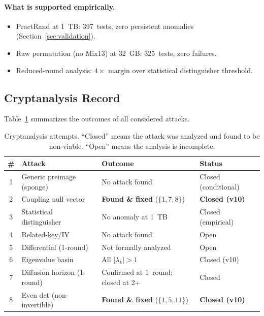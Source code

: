 \documentclass[runningheads]{llncs}
\begin{document}
\paragraph{What is supported empirically.}
\begin{itemize}[nosep]
\item PractRand at 1~TB: 397~tests, zero persistent anomalies (Section~\ref{sec:validation}).
\item Raw permutation (no Mix13) at 32~GB: 325~tests, zero failures.
\item Reduced-round analysis: $4\times$ margin over statistical distinguisher threshold.
\end{itemize}

\subsection{Cryptanalysis Record}

Table~\ref{tab:attacks} summarizes the outcomes of all considered attacks.

\begin{table}[h]
\centering
\caption{Cryptanalysis attempts.  ``Closed'' means the attack was analyzed and
found to be non-viable.  ``Open'' means the analysis is incomplete.}
\label{tab:attacks}
\small
\begin{tabular}{@{}clll@{}}
\toprule
\# & Attack & Outcome & Status \\
\midrule
1 & Generic preimage (sponge) & No attack found & Closed (conditional) \\
2 & Coupling null vector & \textbf{Found \& fixed} ($\{1,7,8\}$) & \textbf{Closed (v10)} \\
3 & Statistical distinguisher & No anomaly at 1~TB & Closed (empirical) \\
4 & Related-key/IV & No attack found & Open \\
5 & Differential (1-round) & Not formally analyzed & Open \\
6 & Eigenvalue basin & All $|\lambda_k| > 1$ & Closed (v10) \\
7 & Diffusion horizon (1-round) & Confirmed at 1~round; closed at 2+ & Closed \\
8 & Even det (non-invertible) & \textbf{Found \& fixed} ($\{1,5,11\}$) & \textbf{Closed (v10)} \\
\bottomrule
\end{tabular}
\end{table}
\end{document}
